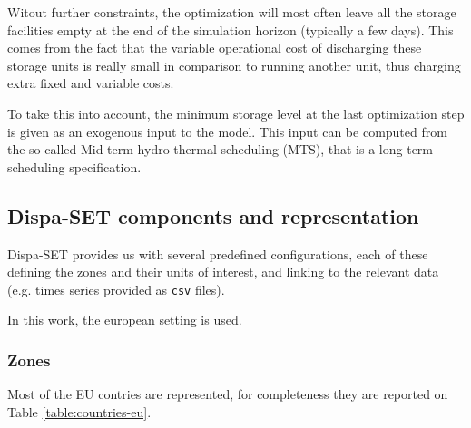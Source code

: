 Witout further constraints, the optimization will most often leave all the storage facilities empty at the end of the simulation horizon (typically a few days). This comes from the fact that the variable operational cost of discharging these storage units is really small in comparison to running another unit, thus charging extra fixed and variable costs.

To take this into account, the minimum storage level at the last optimization step is given as an exogenous input to the model. This input can be computed from the so-called Mid-term hydro-thermal scheduling (MTS), that is a long-term scheduling specification. 


\subsection{Dispa-SET components and representation}

Dispa-SET provides us with several predefined configurations, each of these defining the zones and their units of interest, and linking to the relevant data (e.g. times series provided as \texttt{csv} files).

In this work, the european setting is used.

\subsubsection{Zones}

Most of the EU contries are represented, for completeness they are reported on Table \ref{table:countries-eu}.

